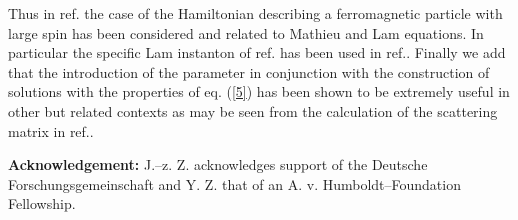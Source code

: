 \documentclass[a4paper,12pt,a4]{article}
\begin{document}
Thus in ref.\cite{5} the case of the Hamiltonian
\coordHE{}
describing a ferromagnetic particle with large spin
has been considered and related to Mathieu and Lam\coordHE{}
equations. 
In particular the specific Lam\coordHE{} instanton
of ref. \cite{1} has been used in ref.\cite{16}.
Finally we add that the introduction of the
parameter \coordHE{} in conjunction with the construction of
solutions with the properties of eq. (\ref{5})
has been shown to be extremely useful in other
but related contexts as may be seen from the
calculation of the scattering matrix in ref.\cite{17}.

\vspace{1cm}


\noindent
{\bf Acknowledgement:} 
J.--z. Z. acknowledges support of the Deutsche Forschungsgemeinschaft
and Y. Z. that of an A. v. Humboldt--Foundation Fellowship.

 
\end{document}
